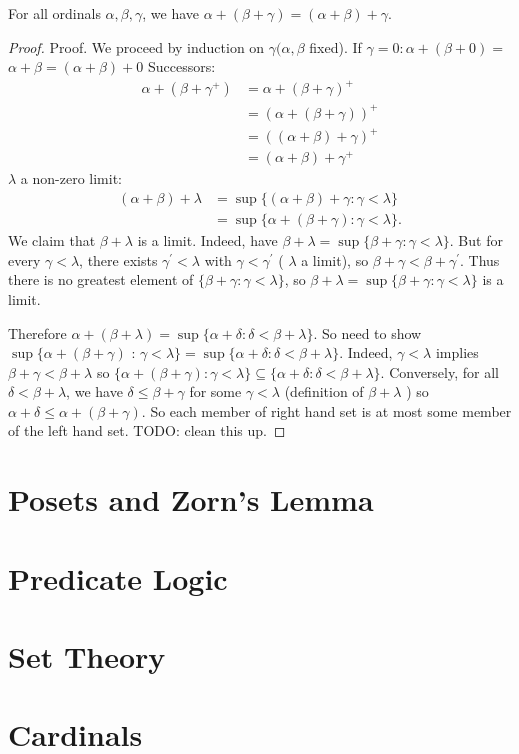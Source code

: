 \documentclass[a4paper]{scrartcl}
\begin{document}
\begin{proposition}
  For all ordinals $\alpha, \beta, \gamma$, we have $\alpha + (\beta + \gamma) = (\alpha + \beta) + \gamma$.
\end{proposition}
\begin{proof}
  Proof. We proceed by induction on $\gamma(\alpha, \beta$ fixed). If $\gamma=0: \alpha+(\beta+0)=$ $\alpha+\beta=(\alpha+\beta)+0$
Successors:
$$
\begin{aligned}
\alpha+\left(\beta+\gamma^{+}\right) & =\alpha+(\beta+\gamma)^{+} \\
& =(\alpha+(\beta+\gamma))^{+} \\
& =((\alpha+\beta)+\gamma)^{+} \\
& =(\alpha+\beta)+\gamma^{+}
\end{aligned}
$$
$\lambda$ a non-zero limit:
$$
\begin{aligned}
(\alpha+\beta)+\lambda & =\sup \{(\alpha+\beta)+\gamma: \gamma<\lambda\} \\
& =\sup \{\alpha+(\beta+\gamma): \gamma<\lambda\} .
\end{aligned}
$$
We claim that $\beta+\lambda$ is a limit. Indeed, have $\beta+\lambda=\sup \{\beta+\gamma: \gamma<\lambda\}$. But for every $\gamma<\lambda$, there exists $\gamma^{\prime}<\lambda$ with $\gamma<\gamma^{\prime}$ ( $\lambda$ a limit), so $\beta+\gamma<\beta+\gamma^{\prime}$. Thus there is no greatest element of $\{\beta+\gamma: \gamma<\lambda\}$, so $\beta+\lambda=\sup \{\beta+\gamma: \gamma<\lambda\}$ is a limit.

Therefore $\alpha+(\beta+\lambda)=\sup \{\alpha+\delta: \delta<\beta+\lambda\}$. So need to show $\sup \{\alpha+(\beta+\gamma)$ : $\gamma<\lambda\}=\sup \{\alpha+\delta: \delta<\beta+\lambda\}$. Indeed, $\gamma<\lambda$ implies $\beta+\gamma<\beta+\lambda$ so $\{\alpha+(\beta+\gamma): \gamma<\lambda\} \subseteq\{\alpha+\delta: \delta<\beta+\lambda\}$. Conversely, for all $\delta<\beta+\lambda$, we have $\delta \leq \beta+\gamma$ for some $\gamma<\lambda$ (definition of $\beta+\lambda$ ) so $\alpha+\delta \leq \alpha+(\beta+\gamma)$. So each member of right hand set is at most some member of the left hand set.
{\color{red} TODO: clean this up}.
\end{proof}




\section{Posets and Zorn's Lemma}

\section{Predicate Logic}

\section{Set Theory}

\section{Cardinals}
\end{document}
